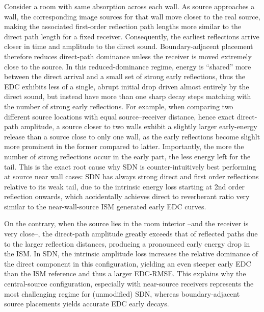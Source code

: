 \documentclass[conference]{IEEEtran}
\begin{document}
Consider a room with same absorption across each wall. As source approaches a wall, the corresponding image sources for that wall move closer to the real source, making the associated first-order reflection path lengths more similar to the direct path length for a fixed receiver. Consequently, the earliest reflections arrive closer in time and amplitude to the direct sound. Boundary-adjacent placement therefore reduces direct-path dominance unless the receiver is moved extremely close to the source. In this reduced-dominance regime, energy is “shared” more between the direct arrival and a small set of strong early reflections, thus the EDC exhibits less of a single, abrupt initial drop driven almost entirely by the direct sound, but instead have more than one sharp decay steps matching with the number of strong early reflections. For example, when comparing two different source locations with equal source–receiver distance, hence exact direct-path amplitude, a source closer to two walls exhibit a slightly larger early-energy release than a source close to only one wall, as the early reflections become slighlt more prominent in the former compared to latter. Importantly, the more the number of strong reflections occur in the early part, the less energy left for the tail. This is the exact root cause why SDN is counter-intuitively best performing at source near wall cases: SDN has always strong direct and first order reflections relative to its weak tail, due to the intrinsic energy loss starting at 2nd order reflection onwards, which accidentally achieves direct to reverberant ratio very similar to the near-wall-source ISM generated early EDC curves.

On the contrary, when the source lies in the room interior --and the receiver is very close--, the direct-path amplitude greatly exceeds that of reflected paths due to the larger reflection distances, producing a pronounced early energy drop in the ISM. In SDN, the intrinsic amplitude loss increases the relative dominance of the direct component in this configuration, yielding an even steeper early EDC than the ISM reference and thus a larger EDC-RMSE. This explains why the central-source configuration, especially with near-source receivers represents the most challenging regime for (unmodified) SDN, whereas boundary-adjacent source placements yields accurate EDC early decays.
\end{document}
